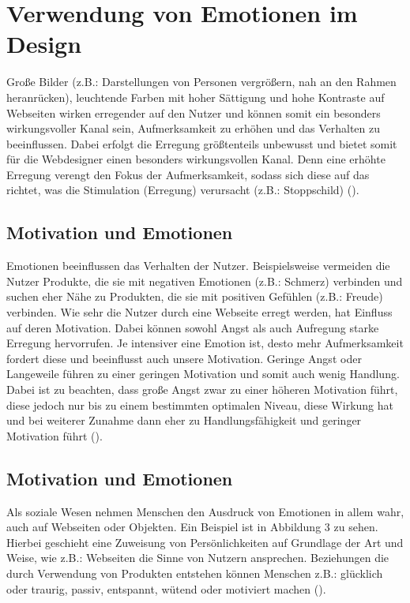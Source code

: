\documentclass[./dokumentation.tex]{subfiles}
\begin{document}
\chapter{Verwendung von Emotionen im Design}
Große Bilder (z.B.: Darstellungen von Personen vergrößern, nah an den Rahmen heranrücken), leuchtende Farben mit hoher Sättigung und hohe Kontraste auf Webseiten wirken erregender auf den Nutzer und können somit ein besonders wirkungsvoller Kanal sein, Aufmerksamkeit zu erhöhen und das Verhalten zu beeinflussen. Dabei erfolgt die Erregung größtenteils unbewusst und bietet somit für die Webdesigner einen besonders wirkungsvollen Kanal. Denn eine erhöhte Erregung verengt den Fokus der Aufmerksamkeit, sodass sich diese auf das richtet,  was die Stimulation (Erregung) verursacht (z.B.: Stoppschild) (\cite{vanGorp2013}). 

\section{Motivation und Emotionen}
Emotionen beeinflussen das Verhalten der Nutzer. Beispielsweise vermeiden die Nutzer Produkte, die sie mit negativen Emotionen (z.B.: Schmerz) verbinden und suchen eher Nähe zu Produkten, die sie mit positiven Gefühlen (z.B.: Freude) verbinden. Wie sehr die Nutzer durch eine Webseite erregt werden, hat Einfluss auf deren Motivation. Dabei können sowohl Angst als auch Aufregung starke Erregung hervorrufen. Je intensiver eine Emotion ist, desto mehr Aufmerksamkeit fordert diese und beeinflusst auch unsere Motivation. Geringe Angst oder Langeweile führen zu einer geringen Motivation und somit auch wenig Handlung. Dabei ist zu beachten, dass große Angst zwar zu einer höheren Motivation führt, diese jedoch nur bis zu einem bestimmten optimalen Niveau, diese Wirkung hat und bei weiterer Zunahme dann eher zu Handlungsfähigkeit und geringer Motivation führt (\cite{vanGorp2013}).

\section{Motivation und Emotionen}
Als soziale Wesen nehmen Menschen den Ausdruck von Emotionen in allem wahr, auch auf Webseiten oder Objekten. Ein Beispiel ist in Abbildung 3 zu sehen. Hierbei geschieht eine Zuweisung von Persönlichkeiten auf Grundlage der Art und Weise, wie z.B.: Webseiten die Sinne von Nutzern ansprechen. Beziehungen die durch Verwendung von Produkten entstehen können Menschen z.B.: glücklich oder traurig, passiv, entspannt, wütend oder motiviert machen (\cite{vanGorp2013}). \\
\end{document}
